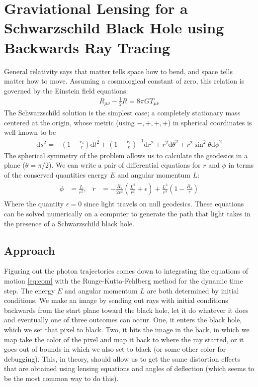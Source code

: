 \documentclass{article}
\begin{document}
\section*{Graviational Lensing for a Schwarzschild Black Hole using Backwards Ray Tracing}
	General relativity says that matter tells space how to bend, and space tells matter how to move. Assuming a cosmological constant of zero, this relation is governed by the Einstein field equations:
	\begin{align}
		R_{\mu\nu}-\frac{1}{2}R=8\pi G T_{\mu\nu}
	\end{align}
	The Schwarzschild solution is the simplest case; a completely stationary mass centered at the origin, whose metric (using \(-,+,+,+\)) in spherical coordinates is well known to be
	\begin{align}
		\mathrm{d}s^{2}=-\left(1-\frac{r_{s}}{r}\right)\mathrm{d}t^{2}+\left(1-\frac{r_{s}}{r}\right)^{-1}\mathrm{d}r^{2}+r^{2}\mathrm{d}\theta^{2}+r^{2}\sin^{2}\theta\mathrm{d}\phi^{2}
	\end{align}
	The spherical symmetry of the problem allows us to calculate the geodesics in a plane (\(\theta=\pi/2\)). We can write a pair of differential equations for \(r\) and \(\phi\) in terms of the conserved quantities energy \(E\) and angular momentum \(L\):
	\begin{align}\label{eq:eom}
		\begin{aligned}
			\ddot{\phi}&=\frac{L}{r^{2}}, & \ddot{r}&=-\frac{R_{s}}{2r^{2}}\left(\frac{L^{2}}{r^{2}}+\epsilon\right)+\frac{L^{2}}{r^{3}}\left(1-\frac{R_{s}}{r}\right)
		\end{aligned}
	\end{align}
	Where the quantity \(\epsilon=0\) since light travels on null geodesics. These equations can be solved numerically on a computer to generate the path that light takes in the presence of a Schwarzschild black hole. 
	
\subsection*{Approach}
Figuring out the photon trajectories comes down to integrating the equations of motion \ref{eq:eom} with the Runge-Kutta-Fehlberg method for the dynamic time step. The energy \(E\) and angular momentum \(L\) are both determined by initial conditions. We make an image by sending out rays with initial conditions backwards from the start plane toward the black hole, let it do whatever it does and eventually one of three outcomes can occur. One, it enters the black hole, which we set that pixel to black. Two, it hits the image in the back, in which we map take the color of the pixel and map it back to where the ray started, or it goes out of bounds in which we also set to black (or some other color for debugging). This, in theory, should allow us to get the same distortion effects that are obtained using lensing equations and angles of deflection (which seems to be the most common way to do this). 
\end{document}
